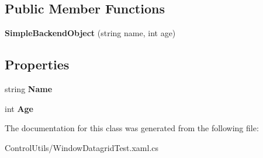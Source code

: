 \subsection*{Public Member Functions}
\begin{DoxyCompactItemize}
\item 
{\bfseries Simple\+Backend\+Object} (string name, int age)\hypertarget{class_power_system_planning_wpf_app_1_1_control_utils_1_1_simple_backend_object_af99b564ac0c1e4f67fc8c0d045e3a68c}{}\label{class_power_system_planning_wpf_app_1_1_control_utils_1_1_simple_backend_object_af99b564ac0c1e4f67fc8c0d045e3a68c}

\end{DoxyCompactItemize}
\subsection*{Properties}
\begin{DoxyCompactItemize}
\item 
string {\bfseries Name}\hypertarget{class_power_system_planning_wpf_app_1_1_control_utils_1_1_simple_backend_object_a43680268921f04aa8c406c2b7f0523eb}{}\label{class_power_system_planning_wpf_app_1_1_control_utils_1_1_simple_backend_object_a43680268921f04aa8c406c2b7f0523eb}

\item 
int {\bfseries Age}\hypertarget{class_power_system_planning_wpf_app_1_1_control_utils_1_1_simple_backend_object_ab43f860f6996a28d5f7ea99d04006bba}{}\label{class_power_system_planning_wpf_app_1_1_control_utils_1_1_simple_backend_object_ab43f860f6996a28d5f7ea99d04006bba}

\end{DoxyCompactItemize}


The documentation for this class was generated from the following file\+:\begin{DoxyCompactItemize}
\item 
Control\+Utils/Window\+Datagrid\+Test.\+xaml.\+cs\end{DoxyCompactItemize}
